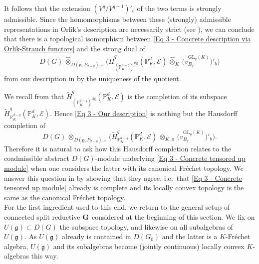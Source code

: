 \documentclass[a4paper, reqno, 10pt]{amsart}
\theoremstyle{definition}
\numberwithin{equation}{section}
\newcommand{\botimes}[1]{{\,\otimes_{#1}\,}}
\newcommand{\cotimes}[1]{{\,\widehat{\otimes}_{#1}\,}}
\newcommand{\GL}{{\mathrm{GL}}}
\newcommand{\rig}{{\mathrm{rig}}}
\newcommand{\BP}{{\mathbb {P}}}
\newcommand{\CE}{{\mathcal {E}}}
\newcommand{\bG}{{\mathrm{\bf G}}}
\newcommand{\Fg}{{\mathfrak {g}}}
\begin{document}
It follows that the extension $(V^q/V^{q-1})'_b$ of the two terms is strongly admissible.
Since the homomorphisms between these (strongly) admissible representations in Orlik's description are necessarily strict (see \cite[Prop.\ 6.4 (ii)]{SchneiderTeitelbaum03AlgpAdicDistAdmRep}), we can conclude that there is a topological isomorphism between \eqref{Eq 3 - Concrete description via Orlik-Strauch functors} and the strong dual of
\begin{align}\label{Eq 3 - Our description}
	D(G) \cotimes{D(\Fg,P_{d-q}),\iota} \bigg( \widetilde{H}^{q}_{(\BP_K^{d-q})^\rig} (\BP_K^d, \CE) \cotimes{K} \Big( v^{\GL_{q}(K)}_{B_{q}} \Big)'_b \bigg) 
\end{align}
from our description in  by the uniqueness of the quotient.



We recall from  that $\widetilde{H}^{q}_{(\BP_K^{d-q})^\rig} (\BP_K^d, \CE)$ is the completion of its subspace $\widetilde{H}^{q}_{\BP_K^{d-q}} (\BP_K^d, \CE)$.
Hence \eqref{Eq 3 - Our description} is nothing but the Hausdorff completion of
\begin{equation}\label{Eq 3 - Concrete tensored up module}
	D(G) \botimes{D(\Fg,P_{d-q}),\iota} \bigg( \widetilde{H}^{q}_{\BP_K^{d-q}} (\BP_K^d, \CE) \botimes{K,\pi} \Big( v^{\GL_{q}(K)}_{B_{q}} \Big)'_b \bigg) .
\end{equation}
Therefore it is natural to ask how this Hausdorff completion relates to the coadmissible abstract $D(G)$-module underlying \eqref{Eq 3 - Concrete tensored up module} when one considers the latter with its canonical Fr\'echet topology.
We answer this question in  by showing that they agree, i.e.\ that \eqref{Eq 3 - Concrete tensored up module} already is complete and its locally convex topology is the same as the canonical Fr\'echet topology.
\\



For the first ingredient used to this end, we return to the general setup of connected split reductive $\bG$ considered at the beginning of this section.
We fix on $U(\Fg) \subset D(G)$ the subspace topology, and likewise on all subalgebras of $U(\Fg)$. 
As $U(\Fg)$ already is contained in $D(G_0)$ and the latter is a $K$-Fr\'echet algebra, $U(\Fg)$ and its subalgebras become (jointly continuous) locally convex $K$-algebras this way.
\end{document}
